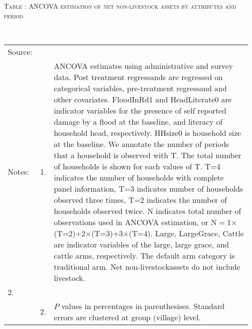 \hspace{-1cm}\begin{minipage}[t]{14cm}
\hfil\textsc{\normalsize Table \thetable: ANCOVA estimation of net non-livestock assets by attributes and period\label{tab ANCOVA NetNLAssets timevarying attributes}}\\
\setlength{\tabcolsep}{1pt}
\setlength{\baselineskip}{8pt}
\renewcommand{\arraystretch}{.55}
\hfil{}\\
\renewcommand{\arraystretch}{.8}
\setlength{\tabcolsep}{1pt}
\begin{tabular}{>{\hfill\scriptsize}p{1cm}<{}>{\hfill\scriptsize}p{.25cm}<{}>{\scriptsize}p{12cm}<{\hfill}}
Source:& \multicolumn{2}{l}{\scriptsize Estimated with GUK administrative and survey data.}\\
Notes: & 1. & ANCOVA estimates using administrative and survey data. Post treatment regressands are regressed on categorical variables, pre-treatment regressand and other covariates. \textsf{FloodInRd1} and \textsf{HeadLiterate0} are indicator variables for the presence of self reported damage by a flood at the baseline, and literacy of household head, respectively. \textsf{HHsize0} is household size at the baseline. We annotate the number of periods that a household is observed with \textsf{T}. The total number of households is shown for each values of \textsf{T}. \textsf{T=4} indicates the number of households with complete panel information, \textsf{T=3} indicates number of households observed three times, \textsf{T=2} indicates the number of households observed twice. \textsf{N} indicates total number of observations used in ANCOVA estimation, or \textsf{N$=$1$\times$(T=2)+2$\times$(T=3)+3$\times$(T=4)}.  \textsf{Large}, \textsf{LargeGrace}, \textsf{Cattle} are indicator variables of the \textsf{large}, \textsf{large grace}, and \textsf{cattle} arms, respectively. The default arm category is \textsf{traditional} arm. Net non-livestockassets do not include livestock. \\
2.\\
& 2. & $P$ values in percentages in parenthesises. Standard errors are clustered at group (village) level.
\end{tabular}
\end{minipage}


